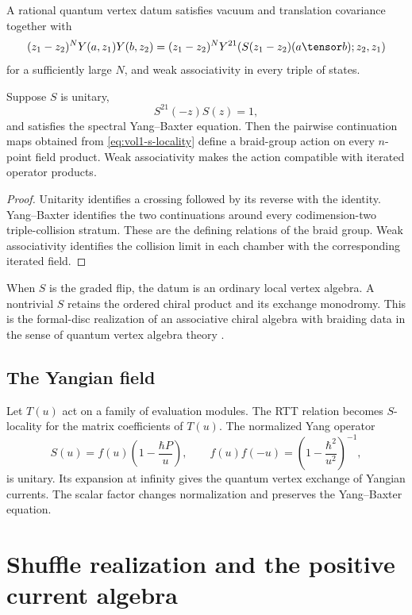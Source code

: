 \begin{definition}
A rational quantum vertex datum satisfies vacuum and translation covariance together with
\begin{equation}\label{eq:vol1-s-locality}
 (z_1-z_2)^N Y(a,z_1)Y(b,z_2)
 =(z_1-z_2)^N
 Y^{21}\!\left(S(z_1-z_2)(a\tensor b);z_2,z_1\right)
\end{equation}
for a sufficiently large $N$, and weak associativity in every triple of states.
\end{definition}

\begin{theorem}
Suppose $S$ is unitary,
\[
 S^{21}(-z)S(z)=1,
\]
and satisfies the spectral Yang--Baxter equation.  Then the pairwise continuation maps obtained from \eqref{eq:vol1-s-locality} define a braid-group action on every $n$-point field product.  Weak associativity makes the action compatible with iterated operator products.
\end{theorem}
\begin{proof}
Unitarity identifies a crossing followed by its reverse with the identity.  Yang--Baxter identifies the two continuations around every codimension-two triple-collision stratum.  These are the defining relations of the braid group.  Weak associativity identifies the collision limit in each chamber with the corresponding iterated field.
\end{proof}

When $S$ is the graded flip, the datum is an ordinary local vertex algebra.  A nontrivial $S$ retains the ordered chiral product and its exchange monodromy.  This is the formal-disc realization of an associative chiral algebra with braiding data in the sense of quantum vertex algebra theory \cite{LiNonlocal,LiQVA}.

\section{The Yangian field}
Let $T(u)$ act on a family of evaluation modules.  The RTT relation becomes $S$-locality for the matrix coefficients of $T(u)$.  The normalized Yang operator
\[
 S(u)=f(u)\left(1-\frac{\hbar P}{u}\right),
 \qquad
 f(u)f(-u)=\left(1-\frac{\hbar^2}{u^2}\right)^{-1},
\]
is unitary.  Its expansion at infinity gives the quantum vertex exchange of Yangian currents.  The scalar factor changes normalization and preserves the Yang--Baxter equation.

\chapter{Shuffle realization and the positive current algebra}
